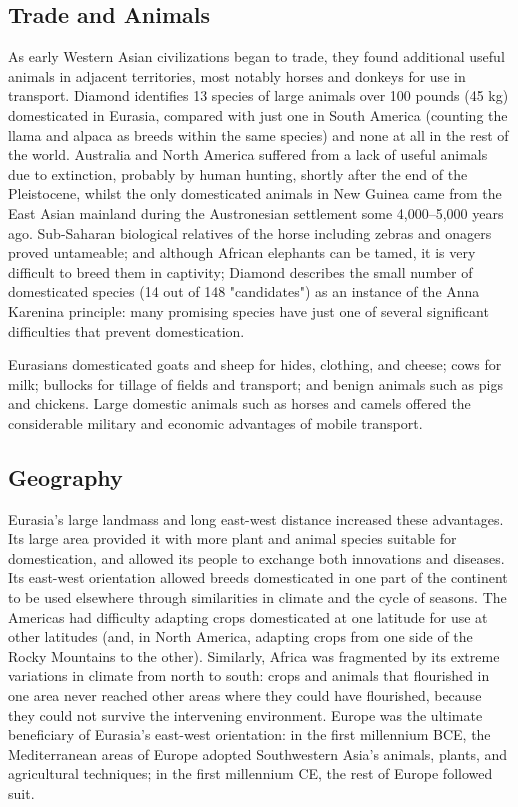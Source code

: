 \subsection{Trade and Animals}

As early Western Asian civilizations began to trade, they found additional useful animals in adjacent territories, most notably horses and donkeys for use in transport. Diamond identifies 13 species of large animals over 100 pounds (45 kg) domesticated in Eurasia, compared with just one in South America (counting the llama and alpaca as breeds within the same species) and none at all in the rest of the world. Australia and North America suffered from a lack of useful animals due to extinction, probably by human hunting, shortly after the end of the Pleistocene, whilst the only domesticated animals in New Guinea came from the East Asian mainland during the Austronesian settlement some 4,000–5,000 years ago. Sub-Saharan biological relatives of the horse including zebras and onagers proved untameable; and although African elephants can be tamed, it is very difficult to breed them in captivity; Diamond describes the small number of domesticated species (14 out of 148 "candidates") as an instance of the Anna Karenina principle: many promising species have just one of several significant difficulties that prevent domestication.

Eurasians domesticated goats and sheep for hides, clothing, and cheese; cows for milk; bullocks for tillage of fields and transport; and benign animals such as pigs and chickens. Large domestic animals such as horses and camels offered the considerable military and economic advantages of mobile transport.

\subsection{Geography}

Eurasia's large landmass and long east-west distance increased these advantages. Its large area provided it with more plant and animal species suitable for domestication, and allowed its people to exchange both innovations and diseases. Its east-west orientation allowed breeds domesticated in one part of the continent to be used elsewhere through similarities in climate and the cycle of seasons. The Americas had difficulty adapting crops domesticated at one latitude for use at other latitudes (and, in North America, adapting crops from one side of the Rocky Mountains to the other). Similarly, Africa was fragmented by its extreme variations in climate from north to south: crops and animals that flourished in one area never reached other areas where they could have flourished, because they could not survive the intervening environment. Europe was the ultimate beneficiary of Eurasia's east-west orientation: in the first millennium BCE, the Mediterranean areas of Europe adopted Southwestern Asia's animals, plants, and agricultural techniques; in the first millennium CE, the rest of Europe followed suit.

